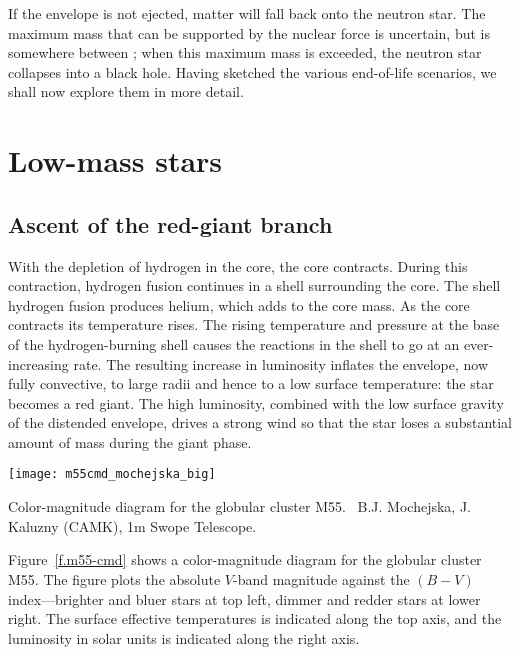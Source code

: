 If the envelope is not ejected, matter will fall back onto the neutron star. The maximum mass that can be supported by the nuclear force is uncertain, but is somewhere between ; when this maximum mass is exceeded, the neutron star collapses into a black hole.
Having sketched the various end-of-life scenarios, we shall now explore them in more detail.

\section{Low-mass stars}

\subsection{Ascent of the red-giant branch}

With the depletion of hydrogen in the core, the core contracts. During this contraction, hydrogen fusion continues in a shell surrounding the core. The shell hydrogen fusion produces helium, which adds to the core mass. As the core contracts its temperature rises. The rising temperature and pressure at the base of the hydrogen-burning shell causes the reactions in the shell to go at an ever-increasing rate. The resulting increase in luminosity inflates the envelope, now fully convective, to large radii and hence to a low surface temperature: the star becomes a red giant. The high luminosity, combined with the low surface gravity of the distended envelope, drives a strong wind so that the star loses a substantial amount of mass during the giant phase.

\begin{marginfigure}
\texttt{[image: m55cmd\_mochejska\_big]}
\caption[Color-magnitude diagram for the globular cluster M55]{\label{f.m55-cmd}Color-magnitude diagram for the globular cluster M55. \imgcred\ B.J. Mochejska, J. Kaluzny (CAMK), 1m Swope Telescope.}
\end{marginfigure}
Figure~\ref{f.m55-cmd} shows a color-magnitude diagram for the globular cluster M55. The figure plots the absolute $V$-band magnitude against the $(B-V)$ index---brighter and bluer stars at top left, dimmer and redder stars at lower right. The surface effective temperatures is indicated along the top axis, and the luminosity in solar units is indicated along the right axis.

